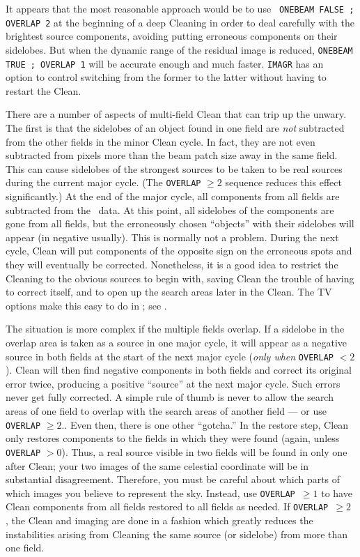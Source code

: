      It appears that the most reasonable approach would be to use {\tt
ONEBEAM FALSE ; OVERLAP 2} at the beginning of a deep Cleaning in
order to deal carefully with the brightest source components, avoiding
putting erroneous components on their sidelobes.  But when the dynamic
range of the residual image is reduced, {\tt ONEBEAM TRUE ; OVERLAP 1}
will be accurate enough and much faster.  {\tt IMAGR} has an {\tt
{}} option to control switching from the former to the
latter without having to restart the Clean.

     There are a number of aspects of multi-field Clean that can trip
up the unwary.  The first is that the sidelobes of an object found in
one field are {\it not\/} subtracted from the other fields in the
minor Clean cycle.  In fact, they are not even subtracted from pixels
more than the beam patch size away in the same field.  This can cause
sidelobes of the strongest sources to be taken to be real sources
during the current major cycle.  (The {\tt OVERLAP} $\ge2$ sequence
reduces this effect significantly.)  At the end of the major cycle,
all components from all fields are subtracted from the \uv\ data.  At
this point, all sidelobes of the components are gone from all fields,
but the erroneously chosen ``objects'' with their sidelobes will
appear (in negative usually).  This is normally not a problem.  During
the next cycle, Clean will put components of the opposite sign on the
erroneous spots and they will eventually be corrected.  Nonetheless,
it is a good idea to restrict the Cleaning to the obvious sources to
begin with, saving Clean the trouble of having to correct itself, and
to open up the search areas later in the Clean.  The TV options make
this easy to do in {\tt {}}; see .

     The situation is more complex if the multiple fields overlap.  If
a sidelobe in the overlap area is taken as a source in one major
cycle, it will appear as a negative source in both fields at the start
of the next major cycle ({\it only when\/} {\tt OVERLAP} $< 2$).
Clean will then find negative components in both fields and correct
its original error twice, producing a positive ``source'' at the next
major cycle. Such errors never get fully corrected.  A simple rule of
thumb is never to allow the search areas of one field to overlap with
the search areas of another field --- or use {\tt OVERLAP} $\ge 2$..
Even then, there is one other ``gotcha.''  In the restore step, Clean
only restores components to the fields in which they were found
(again, unless {\tt OVERLAP} $> 0$).  Thus, a real source visible in
two fields will be found in only one after Clean; your two images of
the same celestial coordinate will be in substantial disagreement.
Therefore, you must be careful about which parts of which images you
believe to represent the sky.  Instead, use {\tt OVERLAP $\ge 1$} to
have Clean components from all fields restored to all fields as
needed.  If {\tt OVERLAP $\ge 2$} , the Clean and imaging are done in
a fashion which greatly reduces the instabilities arising from
Cleaning the same source (or sidelobe) from more than one field.

